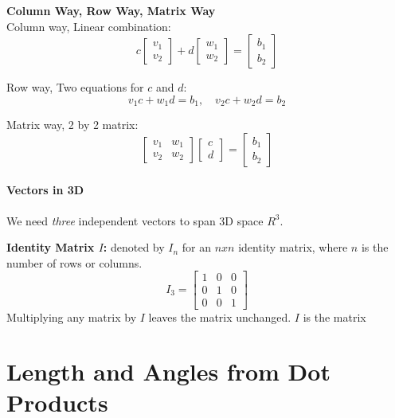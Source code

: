 \begin{mdframed}
	\textbf{Column Way, Row Way, Matrix Way} \\
	\noindent
	Column way, Linear combination:
	\[
		c
		\begin{bmatrix}
			v_{1} \\
			v_{2}
		\end{bmatrix}
		+ d
		\begin{bmatrix}
			w_{1} \\
			w_{2}
		\end{bmatrix}
		=
		\begin{bmatrix}
			b_{1} \\
			b_{2}
		\end{bmatrix}
	\]

	\noindent
	Row way, Two equations for $c$ and $d$:
	\[
		v_{1}c + w_{1}d = b_{1}, \quad v_{2}c + w_{2}d = b_{2}
	\]

	\noindent
	Matrix way, 2 by 2 matrix:
	\[
		\begin{bmatrix}
			v_{1} & w_{1} \\
			v_{2} & w_{2}
		\end{bmatrix}
		\begin{bmatrix}
			c \\
			d
		\end{bmatrix}
		=
		\begin{bmatrix}
			b_{1} \\
			b_{2}
		\end{bmatrix}
	\]
\end{mdframed}

\paragraph{Vectors in 3D}
We need \textit{three} independent vectors to span 3D space $R^3$.

\begin{mdframed}
	\textbf{Identity Matrix $I$:} denoted by $I_n$ for an $nxn$ identity matrix, where $n$ is the number of rows or columns.
	\[
		I_3 =
		\begin{bmatrix}
			1 & 0 & 0 \\
			0 & 1 & 0 \\
			0 & 0 & 1
		\end{bmatrix}
	\]
	Multiplying any matrix by $I$ leaves the matrix unchanged. $I$ is the matrix
\end{mdframed}


\section{Length and Angles from Dot Products}
